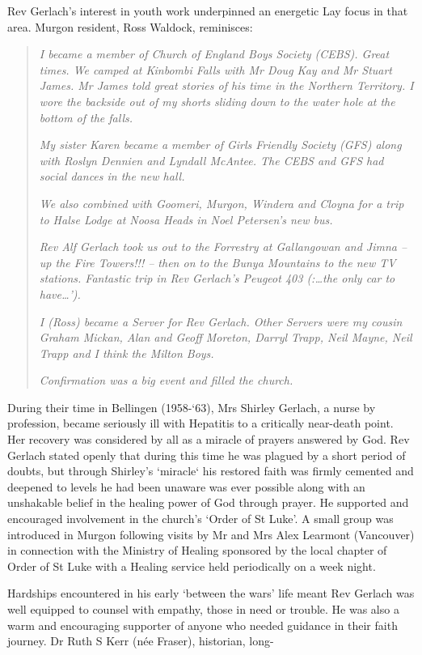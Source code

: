 Rev Gerlach's interest in youth work underpinned an energetic Lay focus
in that area. Murgon resident, Ross Waldock, reminisces:

\begin{quote}
\emph{I became a member of Church of England Boys Society (CEBS). Great
times. We camped at Kinbombi Falls with Mr Doug Kay and Mr Stuart James.
Mr James told great stories of his time in the Northern Territory. I
wore the backside out of my shorts sliding down to the water hole at the
bottom of the falls.}

\emph{My sister Karen became a member of Girls Friendly Society (GFS)
along with Roslyn Dennien and Lyndall McAntee. The CEBS and GFS had
social dances in the new hall.}

\emph{We also combined with Goomeri, Murgon, Windera and Cloyna for a
trip to Halse Lodge at Noosa Heads in Noel Petersen's new bus.}

\emph{Rev Alf Gerlach took us out to the Forrestry at Gallangowan and
Jimna -- up the Fire Towers!!! -- then on to the Bunya Mountains to the
new TV stations. Fantastic trip in Rev Gerlach's Peugeot 403
(:\ldots the only car to have\ldots').}

\emph{I (Ross) became a Server for Rev Gerlach. Other Servers were my
cousin Graham Mickan, Alan and Geoff Moreton, Darryl Trapp, Neil Mayne,
Neil Trapp and I think the Milton Boys.}

\emph{Confirmation was a big event and filled the church.}
\end{quote}

During their time in Bellingen (1958-`63), Mrs Shirley Gerlach, a nurse
by profession, became seriously ill with Hepatitis to a critically
near-death point. Her recovery was considered by all as a miracle of
prayers answered by God. Rev Gerlach stated openly that during this time
he was plagued by a short period of doubts, but through Shirley's
`miracle` his restored faith was firmly cemented and deepened to levels
he had been unaware was ever possible along with an unshakable belief in
the healing power of God through prayer. He supported and encouraged
involvement in the church's `Order of St Luke'. A small group was
introduced in Murgon following visits by Mr and Mrs Alex Learmont
(Vancouver) in connection with the Ministry of Healing sponsored by the
local chapter of Order of St Luke with a Healing service held
periodically on a week night.

Hardships encountered in his early `between the wars' life meant Rev
Gerlach was well equipped to counsel with empathy, those in need or
trouble. He was also a warm and encouraging supporter of anyone who
needed guidance in their faith journey. Dr Ruth S Kerr (née Fraser),
historian, long-

